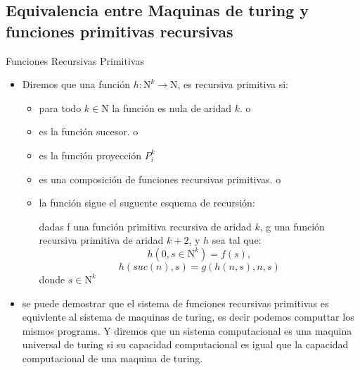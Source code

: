 \documentclass{beamer}
\begin{document}
\subsection{Equivalencia entre Maquinas de turing y funciones primitivas recursivas}
\begin{frame}{Funciones Recursivas Primitivas}
    \begin{itemize}
        \item Diremos que una función $h:\mathrm{N}^k\rightarrow\mathrm{N}$, es recursiva primitiva si:\pause
        \begin{itemize}
            \item para todo $k\in\mathrm{N}$ la función es nula de aridad $k$. o\pause
            \item es la función sucesor. o\pause
            \item es la función proyección $P_i^k$
            \item es una composición de funciones recursivas primitivas. o\pause
            \item la función sigue el suguente esquema de recursión:
            \begin{center}
                dadas f una función primitiva recursiva de aridad $k$, g una función recursiva primitiva de aridad $k+2$, y $h$ sea tal que:
                $$h(0,s\in\mathrm{N}^k)=f(s),$$
                $$h(suc(n),s)=g(h(n,s),n,s)$$
                donde $s\in\mathrm{N}^k$
            \end{center}\pause
        \end{itemize}
    \item se puede demostrar que el sistema de funciones recursivas primitivas es equivlente al sistema de maquinas de turing, es decir podemos computtar los mismos programs. Y diremos que un sistema computacional es una maquina universal de turing si su capacidad computacional es igual que la capacidad computacional de una maquina de turing.
    \end{itemize}
\end{frame}
\end{document}
